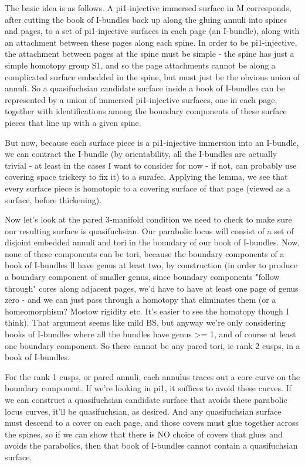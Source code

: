 \documentclass[12pt]{amsart}
\theoremstyle{definition}
\begin{document}
The basic idea is as follows. A pi1-injective immersed surface in
M corresponds, after cutting the book of I-bundles back up along the gluing
annuli into spines and pages, to a set of pi1-injective surfaces in each page
(an I-bundle), along with an attachment between these pages along each spine.
In order to be pi1-injective, the attachment between pages at the spine must be
simple - the spine has just a simple homotopy group S1, and so the page
attachments cannot be along a complicated surface embedded in the spine, but
must just be the obvious union of annuli. So a quasifuchsian candidate surface
inside a book of I-bundles can be represented by a union of immersed
pi1-injective surfaces, one in each page, together with identifications among
the boundary components of these surface pieces that line up with a given
spine.

But now, because each surface piece is a pi1-injective immersion into an
I-bundle, we can contract the I-bundle (by orientability, all the I-bundles are
actually trivial - at least in the cases I want to consider for now - if not,
can probably use covering space trickery to fix it) to a surafec. Applying the
lemma, we see that every surface piece is homotopic to a covering surface of
that page (viewed as a surface, before thickening).

Now let's look at the pared 3-manifold condition we need to check to make sure
our resulting surface is quasifuchsian. Our parabolic locus will consist of
a set of disjoint embedded annuli and tori in the boundary of our book of
I-bundles. Now, none of these components can be tori, because the boundary
components of a book of I-bundles ll have genus at least two, by construction
(in order to produce a boundary component of smaller genus, since boundary
components "follow through" cores along adjacent pages, we'd have to have at
least one page of genus zero - and we can just pass through a homotopy that
eliminates them (or a homeomorphism? Mostow rigidity etc. It's easier to see
the homotopy though I think). That argument seems like mild BS, but anyway
we're only considering books of I-bundles where all the bundles have genus >=
1, and of course at least one boundary component. So there cannot be any pared
tori, ie rank 2 cusps, in a book of I-bundles.

For the rank 1 cusps, or pared annuli, each annulus traces out a core curve on
the boundary component. If we're looking in pi1, it suffices to avoid these
curves. If we can construct a quasifuchsian candidate surface that avoids these
parabolic locus curves, it'll be quasifuchsian, as desired. And any
quasifuchsian surface must descend to a cover on each page, and those covers
must glue together across the spines, so if we can show that there is NO choice
of covers that glues and avoids the parabolics, then that book of I-bundles
cannot contain a quasifuchsian surface.
\end{document}
